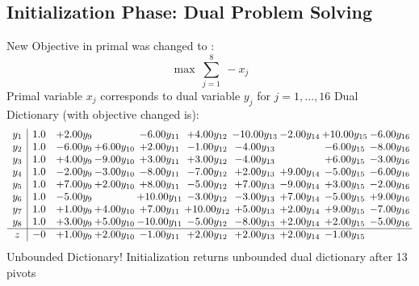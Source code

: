 \documentclass[9pt]{article}
\begin{document}
\subsection{Initialization Phase: Dual Problem Solving}
New Objective in primal was changed to : \[ \max\ \sum_{j=1}^{8}\ - x_j \] 
Primal variable $x_j$ corresponds to dual variable $y_j$ for $j = 1,\ldots,16$
Dual Dictionary (with objective changed is): 
\[\begin{array}{c| c c@{\hskip 2pt} c@{\hskip 2pt} c@{\hskip 2pt} c@{\hskip 2pt} c@{\hskip 2pt} c@{\hskip 2pt} c@{\hskip 2pt} c@{\hskip 2pt} }
 y_{1}   &  1.0 & +  2.00 y_{9} &   & -6.00 y_{11} & +  4.00 y_{12} & -10.00 y_{13} & -2.00 y_{14} & + 10.00 y_{15} & -6.00 y_{16}\\
 y_{2}   &  1.0 & -6.00 y_{9} & +  6.00 y_{10} & +  2.00 y_{11} & -1.00 y_{12} & -4.00 y_{13} &   & -6.00 y_{15} & -8.00 y_{16}\\
 y_{3}   &  1.0 & +  4.00 y_{9} & -9.00 y_{10} & +  3.00 y_{11} & +  3.00 y_{12} & -4.00 y_{13} &   & +  6.00 y_{15} & -3.00 y_{16}\\
 y_{4}   &  1.0 & -2.00 y_{9} & -3.00 y_{10} & -8.00 y_{11} & -7.00 y_{12} & +  2.00 y_{13} & +  9.00 y_{14} & -5.00 y_{15} & -6.00 y_{16}\\
 y_{5}   &  1.0 & +  7.00 y_{9} & +  2.00 y_{10} & +  8.00 y_{11} & -5.00 y_{12} & +  7.00 y_{13} & -9.00 y_{14} & +  3.00 y_{15} & -2.00 y_{16}\\
 y_{6}   &  1.0 & -5.00 y_{9} &   & + 10.00 y_{11} & -3.00 y_{12} & -3.00 y_{13} & +  7.00 y_{14} & -5.00 y_{15} & +  9.00 y_{16}\\
 y_{7}   &  1.0 & +  1.00 y_{9} & +  4.00 y_{10} & +  7.00 y_{11} & + 10.00 y_{12} & +  5.00 y_{13} & +  2.00 y_{14} & +  9.00 y_{15} & -7.00 y_{16}\\
 y_{8}   &  1.0 & +  3.00 y_{9} & +  5.00 y_{10} & -10.00 y_{11} & -5.00 y_{12} & -8.00 y_{13} & +  2.00 y_{14} & +  2.00 y_{15} & -5.00 y_{16}\\
\hline
z    &  -0 & +  1.00 y_{9} & +  2.00 y_{10} & -1.00 y_{11} & +  2.00 y_{12} & +  2.00 y_{13} & +  2.00 y_{14} & -1.00 y_{15} &   \\
\end{array}\]
Unbounded Dictionary!
Initialization returns unbounded dual dictionary after 13 pivots
\end{document}
